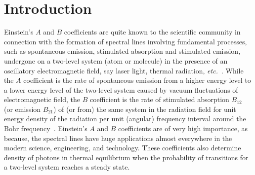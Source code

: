 \documentclass[aps,pra,twocolumn,showpacs,preprintnumbers,amsmath,amssymb,footinbib]{revtex4}
\begin{document}
\section{Introduction}
Einstein's $A$ and $B$ coefficients are quite known to the scientific community in connection with the formation of spectral lines involving fundamental processes, such as spontaneous emission, stimulated absorption and stimulated emission, undergone on a two-level system (atom or molecule) in the presence of an oscillatory electromagnetic field, say laser light, thermal radiation, \textit{etc.}~\cite{Einstein}. While the $A$ coefficient is the rate of spontaneous emission from a higher energy level to a lower energy level of the two-level system caused by vacuum fluctuations of electromagnetic field, the $B$ coefficient is the rate of stimulated absorption $B_{12}$ (or emission $B_{21}$) of (or from) the same system in the radiation field for unit energy density of the radiation per unit (angular) frequency interval around the Bohr frequency~\cite{Einstein,Hilborn}. Einstein's $A$ and $B$ coefficients are of very high importance, as because, the spectral lines have huge applications almost everywhere in the modern science, engineering, and technology. These coefficients also determine density of photons in thermal equilibrium when the probability of transitions for a two-level system reaches a steady state.
\end{document}
